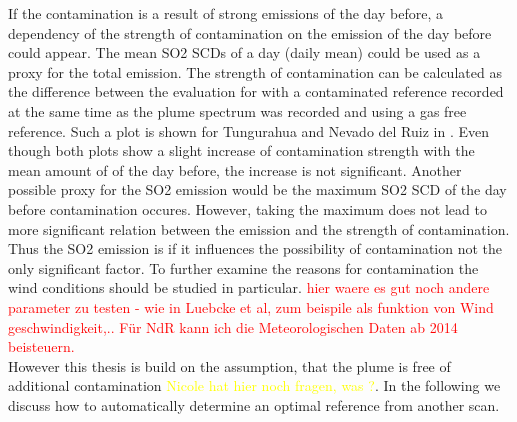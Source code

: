 If the contamination is a result of strong emissions of the day before, a dependency of the strength of contamination on the emission of the day before could appear. 
The mean SO2 SCDs of a day (daily mean) could be used as a proxy for the total emission. The strength of contamination can be calculated as the difference between the evaluation for  with a contaminated reference recorded at the same time as the plume spectrum was recorded and using a gas free reference. Such a plot is shown for Tungurahua and Nevado del Ruiz in . Even though both plots show a slight increase of contamination strength with the mean amount of  of the day before, the increase is not significant. Another possible proxy for the SO2 emission would be the maximum SO2 SCD of the day before contamination occures. However, taking the maximum does not lead to more significant relation between the emission and the strength of contamination. \\
Thus the SO2 emission is if it influences the possibility of contamination not the only significant factor. To further examine the reasons for contamination the wind conditions should be studied in particular. 
\textcolor{red}{hier waere es gut noch andere parameter zu testen - wie in Luebcke et al, zum beispile als funktion von Wind geschwindigkeit,..   Für NdR kann ich die Meteorologischen Daten ab 2014 beisteuern.}
\\
However this thesis is build on the assumption, that the plume is free of additional contamination \textcolor{yellow}{Nicole hat hier noch fragen, was ?}. In the following we discuss how to automatically determine an optimal reference from another scan.
